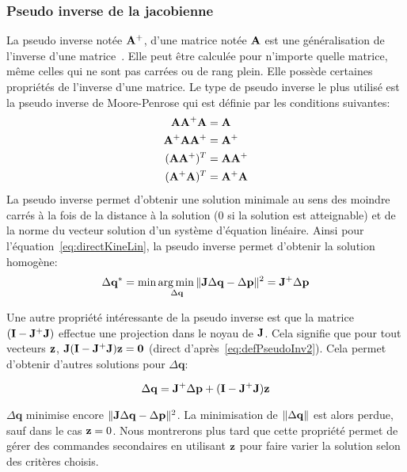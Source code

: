 \subsubsection{Pseudo inverse de la jacobienne}
La pseudo inverse notée ${\mathbf{A}}^+$, d'une matrice notée ${\mathbf{A}}$ est une généralisation de l'inverse d'une matrice~\cite{benisrael03, moore20, penrose55}.
Elle peut être calculée pour n'importe quelle matrice, même celles qui ne sont 
pas carrées ou de rang plein. Elle possède certaines propriétés
de l'inverse d'une matrice. Le type de pseudo inverse le plus
utilisé est la pseudo inverse de Moore-Penrose qui est définie par les conditions
suivantes:
\begin{align}
  \mbf{A}\mbf{A}^+\mbf{A} & = \mbf{A}\\
  \label{eq:defPseudoInv2}
  \mbf{A}^+\mbf{A}\mbf{A}^+ & = \mbf{A}^+\\
  (\mbf{A}\mbf{A}^+)^T & = \mbf{A}\mbf{A}^+\\
  (\mbf{A}^+\mbf{A})^T & = \mbf{A}^+\mbf{A}
  \label{eq:defPseudoInv}
\end{align}
\noindent La pseudo inverse permet d'obtenir une solution minimale au sens des moindre carrés 
à la fois de la distance à la solution ($0$ si la solution est atteignable) et
de la norme du vecteur solution d'un système d'équation linéaire. Ainsi pour l'équation~\eqref{eq:directKineLin},
la pseudo inverse permet d'obtenir la solution homogène:
\begin{equation}
  \Delta \mbf{q}^* = \min \underset{\Delta \mbf{q}}\argmin \Vert \mbf{J} \Delta \mbf{q} - \Delta \mbf{p} \Vert^2
  = \mbf{J}^+ \Delta \mbf{p}
  \label{eq:lstsqsol}
\end{equation}

Une autre propriété intéressante de la pseudo inverse est que la matrice $({\mathbf{I}} - {\mathbf{J}}^{+} {\mathbf{J}})$ effectue une
projection dans le noyau de ${\mathbf{J}}$. Cela signifie que pour tout vecteurs ${\mathbf{z}}$,  
${\mathbf{J}}({\mathbf{I}} - {\mathbf{J}}^{+} {\mathbf{J}}) {\mathbf{z}} = \textbf{0}$ (direct d'après~\eqref{eq:defPseudoInv2}). 
Cela permet d'obtenir d'autres solutions pour $\Delta \mathbf{q}$:

\begin{equation}\label{IK:Ps:EqNullspace}
  \Delta \mathbf{q} = \mbf{J}^{+} \Delta \mathbf{p} + (\mbf{I} -\mbf{J}^{+} \mbf{J}) \mbf{z}
\end{equation}

$\Delta \mathbf{q}$ minimise encore $\Vert {\mathbf{J}} \Delta \mathbf{q} - \Delta \mathbf{p} \Vert^2$.
La minimisation de $\Vert \Delta {\mathbf{q}} \Vert$ est alors perdue, sauf dans le cas ${\mathbf{z}} = 0$.
Nous montrerons plus tard que cette propriété permet de gérer des commandes secondaires en utilisant
${\mathbf{z}}$ pour faire varier la solution selon des critères choisis.

